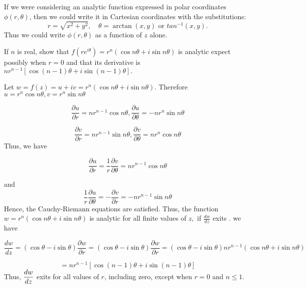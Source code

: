 If we were considering an analytic function expressed in polar coordinates
$\phi(r, \theta)$, then we could write it in Cartesian coordinates with the 
substitutions: 
\[
r = \sqrt{x^2 + y^2}, \quad \theta = \arctan(x, y) \text{ or } tan^{-1}(x,y).
\]
Thus we could write $\phi(r, \theta)$ as a function of $z$ alone.
\begin{example}
If $n$ is real, show that $f(re^{i\theta})=r^{n}(\cos n\theta+i\sin n\theta)$
is analytic expect possibly when $r=0$ and that its derivative is
$nr^{n-1}[\cos(n-1)\theta+i\sin(n-1)\theta].$
\end{example}
\begin{solution}
Let $w=f(z)=u+iv=r^{n}(\cos n\theta+i\sin n\theta)$. Therefore $u=r^{n}\cos n\theta,v=r^{n}\sin n\theta$

\[
\frac{\partial u}{\partial r}=nr^{n-1}\cos n\theta,\frac{\partial u}{\partial\theta}=-nr^{n}\sin n\theta\]


\[
\frac{\partial v}{\partial r}=nr^{n-1}\sin n\theta,\frac{\partial v}{\partial\theta}=nr^{n}\cos n\theta\]
 Thus, we have 

\[
\frac{\partial u}{\partial r}=\frac{1}{r}\frac{\partial v}{\partial\theta}=nr^{n-1}\cos n\theta\]


and \[
\frac{1}{r}\frac{\partial u}{\partial\theta}=-\frac{\partial v}{\partial r}=-nr^{n-1}\sin n\theta\]
 Hence, the Cauchy-Riemann equations are satisfied. Thus, the function
$w=r^{n}(\cos n\theta+i\sin n\theta)$ is analytic for all finite
values of $z,$ if $\frac{dw}{dz}$ exits . we have 

\[
\frac{dw}{dz}=(\cos\theta-i\sin\theta)\frac{\partial w}{\partial r}=(\cos\theta-i\sin\theta)\frac{\partial w}{\partial r}=(\cos\theta-i\sin\theta)nr^{n-1}(\cos n\theta+i\sin n\theta)\]


\[
=nr^{n-1}[\cos(n-1)\theta+i\sin(n-1)\theta]\]
Thus, $\displaystyle\frac{dw}{dz}$ exits for all values of $r$, including
zero, except when $r=0$ and $n\le1.$  
\end{solution}


